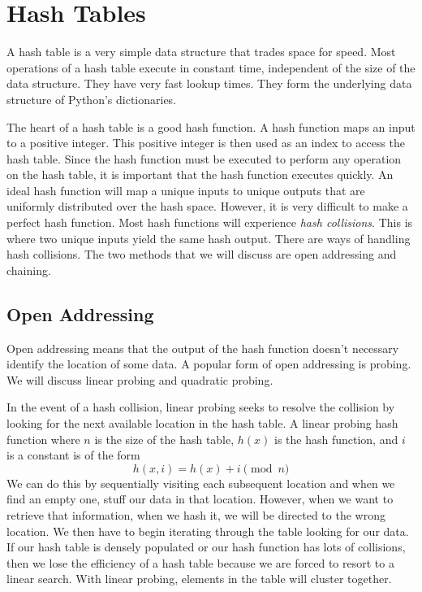 \section*{Hash Tables}
A hash table is a very simple data structure that trades space for speed.
Most operations of a hash table execute in constant time, independent of the size of the data structure.  
They have very fast lookup times.  They form the underlying data structure of Python's dictionaries.

The heart of a hash table is a good hash function.  
A hash function maps an input to a positive integer. 
This positive integer is then used as an index to access the hash table. 
Since the hash function must be executed to perform any operation on the hash table, it is important that the hash function executes quickly.
An ideal hash function will map a unique inputs to unique outputs that are uniformly distributed over the hash space. 
However, it is very difficult to make a perfect hash function.  Most hash functions will experience \emph{hash collisions}. 
This is where two unique inputs yield the same hash output.
There are ways of handling hash collisions.  The two methods that we will discuss are open addressing and chaining.

\subsection*{Open Addressing}
Open addressing means that the output of the hash function doesn't necessary identify the location of some data.
A popular form of open addressing is probing. 
We will discuss linear probing and quadratic probing.

In the event of a hash collision, linear probing seeks to resolve the collision by looking for the next available location in the hash table.
A linear probing hash function where $n$ is the size of the hash table, $h(x)$ is the hash function, and $i$ is a constant is of the form
\begin{equation*}
h(x, i) = h(x) + i \pmod{n}
\end{equation*}
We can do this by sequentially visiting each subsequent location and when we find an empty one, stuff our data in that location.  
However, when we want to retrieve that information, when we hash it, we will be directed to the wrong location. 
We then have to begin iterating through the table looking for our data.
If our hash table is densely populated or our hash function has lots of collisions, 
then we lose the efficiency of a hash table because we are forced to resort to a linear search.
With linear probing, elements in the table will cluster together.

